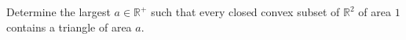 Determine the largest $a \in \mathbb{R}^{+}$ such that
every closed convex subset of $\mathbb{R}^2$ of area $1$
contains a triangle of area $a$.
